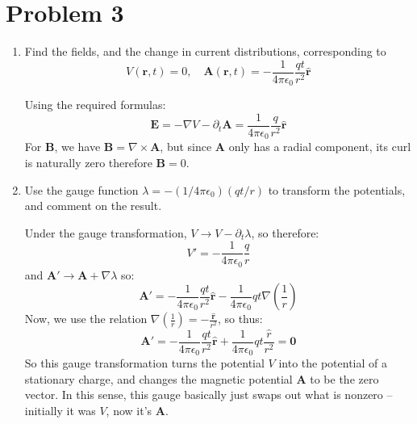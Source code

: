 \documentclass[10pt]{article}
\begin{document}
	\section*{Problem 3}
	\begin{enumerate}[label=(\alph*)]
		\item Find the fields, and the change in current distributions, corresponding to 
			\[
				V(\mathbf{r}, t) = 0, \quad \mathbf{A}(\mathbf{r}, t) = -\frac{1}{4\pi \epsilon_0}
				\frac{qt}{r^2} \mathbf{\hat{r}}
			\]

			\begin{solution}
				Using the required formulas:
				\[
					\mathbf{E} = -\nabla V - \partial_t \mathbf{A} = \frac{1}{4\pi \epsilon_0} \frac{q}{r^2}
					\mathbf{\hat{r}}
				\]
				For \( \mathbf{B} \), we have \( \mathbf{B} = \nabla \times \mathbf{A} \), but since \(
				\mathbf{A} \) only has a radial component, its curl is naturally zero therefore \( \mathbf{B}
				= 0\). 
			\end{solution}
		\item Use the gauge function \( \lambda = - (1 / 4 \pi \epsilon_0) (qt / r) \) to transform the
			potentials, and comment on the result.  

			\begin{solution}
				Under the gauge transformation, \( V \to V - \partial_t \lambda \), so therefore:
				\[
					V' = -\frac{1}{4\pi \epsilon_0}\frac{q}{r}
				\]
				and \( \mathbf{A}' \to \mathbf{A} + \nabla \lambda \) so:
				\[
					\mathbf{A}' = -\frac{1}{4\pi \epsilon_0} \frac{qt}{r^2}\mathbf{\hat{r}} - \frac{1}{4\pi
					\epsilon_0}qt \nabla \left( \frac{1}{r} \right)
				\]
				Now, we use the relation \( \nabla\left( \frac{1}{r} \right) = -\frac{\mathbf{\hat{r}}}{r^2}
				\), so thus:
				\[
					\mathbf{A}' = -\frac{1}{4\pi \epsilon_0} \frac{qt}{r^2}\mathbf{\hat{r}} + \frac{1}{4\pi
					\epsilon_0} qt \frac{\hat{r}}{r^2} = \mathbf{0}
				\]
				So this gauge transformation turns the potential \( V \) into the potential of a stationary
				charge, and changes the magnetic potential \( \mathbf{A} \) to be the zero vector. In this
				sense, this gauge basically just swaps out what is nonzero -- initially it was \( V \), now
				it's \( \mathbf{A} \). 
			\end{solution}
	\end{enumerate}
\end{document}
